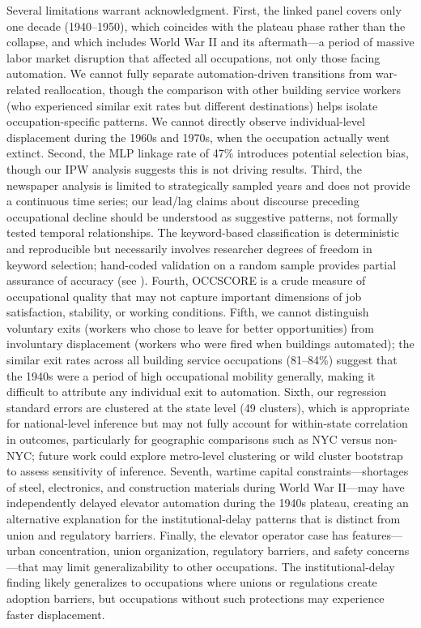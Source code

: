 \documentclass[12pt]{article}
\begin{document}
Several limitations warrant acknowledgment. First, the linked panel covers only one decade (1940--1950), which coincides with the plateau phase rather than the collapse, and which includes World War II and its aftermath---a period of massive labor market disruption that affected all occupations, not only those facing automation. We cannot fully separate automation-driven transitions from war-related reallocation, though the comparison with other building service workers (who experienced similar exit rates but different destinations) helps isolate occupation-specific patterns. We cannot directly observe individual-level displacement during the 1960s and 1970s, when the occupation actually went extinct. Second, the MLP linkage rate of 47\% introduces potential selection bias, though our IPW analysis suggests this is not driving results. Third, the newspaper analysis is limited to strategically sampled years and does not provide a continuous time series; our lead/lag claims about discourse preceding occupational decline should be understood as suggestive patterns, not formally tested temporal relationships. The keyword-based classification is deterministic and reproducible but necessarily involves researcher degrees of freedom in keyword selection; hand-coded validation on a random sample provides partial assurance of accuracy (see ). Fourth, OCCSCORE is a crude measure of occupational quality that may not capture important dimensions of job satisfaction, stability, or working conditions. Fifth, we cannot distinguish voluntary exits (workers who chose to leave for better opportunities) from involuntary displacement (workers who were fired when buildings automated); the similar exit rates across all building service occupations (81--84\%) suggest that the 1940s were a period of high occupational mobility generally, making it difficult to attribute any individual exit to automation. Sixth, our regression standard errors are clustered at the state level (49 clusters), which is appropriate for national-level inference but may not fully account for within-state correlation in outcomes, particularly for geographic comparisons such as NYC versus non-NYC; future work could explore metro-level clustering or wild cluster bootstrap to assess sensitivity of inference. Seventh, wartime capital constraints---shortages of steel, electronics, and construction materials during World War II---may have independently delayed elevator automation during the 1940s plateau, creating an alternative explanation for the institutional-delay patterns that is distinct from union and regulatory barriers. Finally, the elevator operator case has features---urban concentration, union organization, regulatory barriers, and safety concerns---that may limit generalizability to other occupations. The institutional-delay finding likely generalizes to occupations where unions or regulations create adoption barriers, but occupations without such protections may experience faster displacement.
\end{document}
